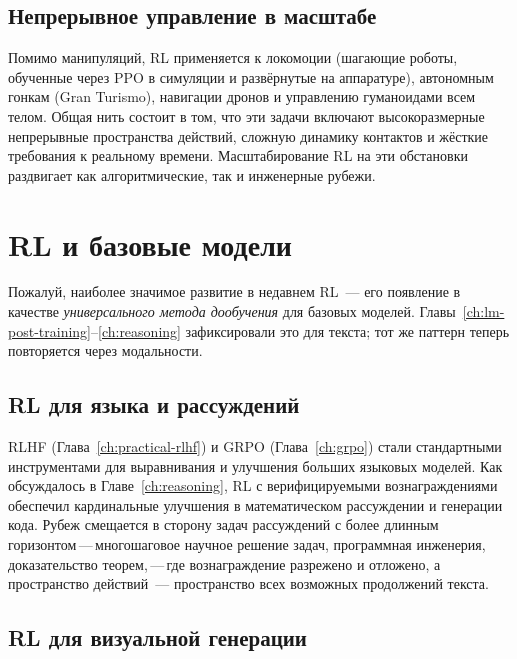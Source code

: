 \subsection{Непрерывное управление в масштабе}

Помимо манипуляций, RL применяется к локомоции (шагающие
роботы, обученные через PPO в симуляции и развёрнутые на аппаратуре),
автономным гонкам (Gran Turismo), навигации дронов и управлению
гуманоидами всем телом. Общая нить состоит в том, что эти задачи включают
высокоразмерные непрерывные пространства действий, сложную динамику контактов
и жёсткие требования к реальному времени. Масштабирование RL на эти обстановки
раздвигает как алгоритмические, так и инженерные рубежи.


\section{RL и базовые модели}
\label{sec:open-foundation}

Пожалуй, наиболее значимое развитие в недавнем RL~--- его появление
в качестве \emph{универсального метода дообучения} для базовых
моделей. Главы~\ref{ch:lm-post-training}--\ref{ch:reasoning}
зафиксировали это для текста; тот же паттерн теперь повторяется через
модальности.

\subsection{RL для языка и рассуждений}

RLHF (Глава~\ref{ch:practical-rlhf}) и GRPO (Глава~\ref{ch:grpo}) стали
стандартными инструментами для выравнивания и улучшения больших языковых моделей.
Как обсуждалось в Главе~\ref{ch:reasoning}, RL с верифицируемыми вознаграждениями
обеспечил кардинальные улучшения в математическом рассуждении и генерации кода.
Рубеж смещается в сторону задач рассуждений с более длинным горизонтом\,---\,многошаговое
научное решение задач, программная инженерия, доказательство теорем,\,---\,где
вознаграждение разрежено и отложено, а пространство действий~--- пространство
всех возможных продолжений текста.

\subsection{RL для визуальной генерации}

